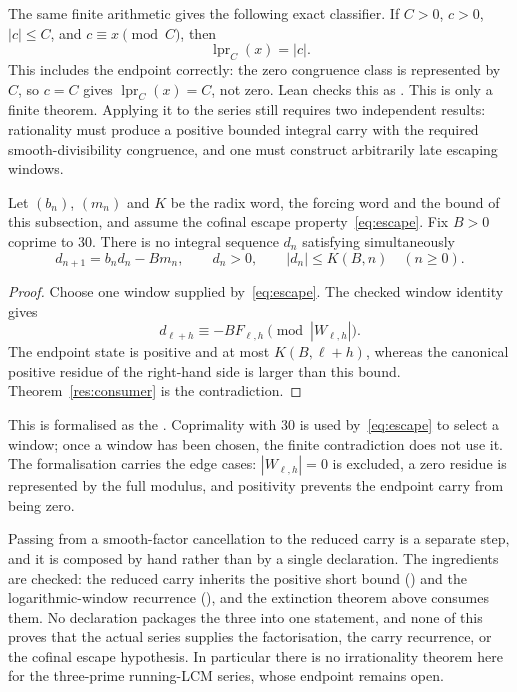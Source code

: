 \documentclass[11pt]{article}
\begin{document}
The same finite arithmetic gives the following exact classifier.  If $C>0$,
$c>0$, $|c|\le C$, and
$c\equiv x\pmod C$, then
\[
  \operatorname{lpr}_C(x)=|c|.
\]
This includes the endpoint correctly: the zero congruence class is represented
by $C$, so $c=C$ gives $\operatorname{lpr}_C(x)=C$, not zero.  Lean checks this
as
.  This is only a finite theorem.  Applying
it to the series still requires two independent results: rationality
must produce a positive bounded integral carry with the required
smooth-divisibility congruence, and one must construct arbitrarily late
escaping windows.

\begin{theorem}\label{res:windowconsumer}
Let $(b_n)$, $(m_n)$ and $K$ be the radix word, the forcing word and the bound
of this subsection, and assume the cofinal escape
property~\eqref{eq:escape}.  Fix $B>0$ coprime to
$30$.  There is no integral sequence $d_n$ satisfying simultaneously
\[
 d_{n+1}=b_nd_n-Bm_n,\qquad d_n>0,\qquad
 |d_n|\le K(B,n)\quad(n\ge0).
\]
\end{theorem}

\begin{proof}
Choose one window supplied by~\eqref{eq:escape}.  The checked window identity
gives
\[
 d_{\ell+h}\equiv -BF_{\ell,h}\pmod{|W_{\ell,h}|}.
\]
The endpoint state is positive and at most $K(B,\ell+h)$, whereas the
canonical positive residue of the right-hand side is larger than this bound.
Theorem~\ref{res:consumer} is the contradiction.
\end{proof}

\noindent This is formalised as the
.  Coprimality with $30$ is used by~\eqref{eq:escape} to
select a window; once a window has been chosen, the finite contradiction does
not use it.  The formalisation carries the edge cases: $|W_{\ell,h}|=0$ is
excluded, a zero residue is represented by the full modulus, and positivity
prevents the endpoint carry from being zero.

Passing from a smooth-factor cancellation to the reduced carry is a separate
step, and it is composed by hand rather than by a single declaration.  The
ingredients are checked: the reduced carry inherits the positive short bound
() and the logarithmic-window recurrence
(), and the extinction theorem above consumes them.  No declaration
packages the three into one statement, and none of this proves that the actual
series supplies the factorisation, the carry recurrence, or the cofinal escape
hypothesis.  In particular there is no irrationality theorem here for the
three-prime running-LCM series, whose endpoint remains open.
\end{document}
